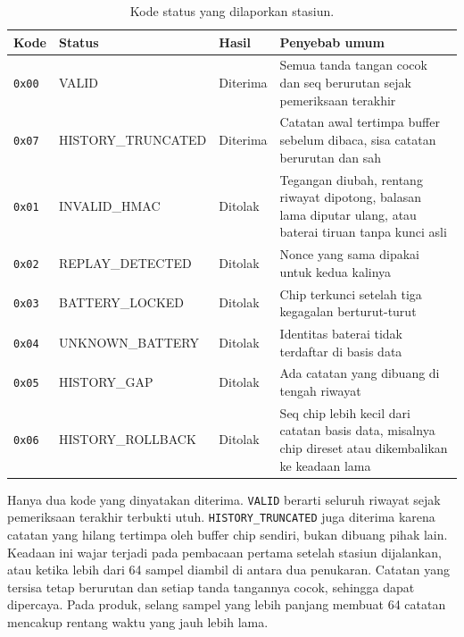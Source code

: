 \documentclass[11pt,a4paper]{article}
\begin{document}
\begin{table}[H]
  \centering
  \small
  \begin{tabularx}{\textwidth}{l l l X}
    \toprule
    Kode & Status & Hasil & Penyebab umum \\
    \midrule
    \texttt{0x00} & VALID & \textcolor{okgreen}{Diterima} & Semua tanda tangan cocok dan seq
      berurutan sejak pemeriksaan terakhir \\
    \texttt{0x07} & HISTORY\_TRUNCATED & \textcolor{okgreen}{Diterima} & Catatan awal tertimpa
      buffer sebelum dibaca, sisa catatan berurutan dan sah \\
    \midrule
    \texttt{0x01} & INVALID\_HMAC & \textcolor{accentred}{Ditolak} & Tegangan diubah, rentang
      riwayat dipotong, balasan lama diputar ulang, atau baterai tiruan tanpa kunci asli \\
    \texttt{0x02} & REPLAY\_DETECTED & \textcolor{accentred}{Ditolak} & Nonce yang sama dipakai
      untuk kedua kalinya \\
    \texttt{0x03} & BATTERY\_LOCKED & \textcolor{accentred}{Ditolak} & Chip terkunci setelah tiga
      kegagalan berturut-turut \\
    \texttt{0x04} & UNKNOWN\_BATTERY & \textcolor{accentred}{Ditolak} & Identitas baterai tidak
      terdaftar di basis data \\
    \texttt{0x05} & HISTORY\_GAP & \textcolor{accentred}{Ditolak} & Ada catatan yang dibuang di
      tengah riwayat \\
    \texttt{0x06} & HISTORY\_ROLLBACK & \textcolor{accentred}{Ditolak} & Seq chip lebih kecil dari
      catatan basis data, misalnya chip direset atau dikembalikan ke keadaan lama \\
    \bottomrule
  \end{tabularx}
  \caption{Kode status yang dilaporkan stasiun.}
  \label{tab:status}
\end{table}

Hanya dua kode yang dinyatakan diterima. \texttt{VALID} berarti seluruh riwayat sejak pemeriksaan
terakhir terbukti utuh. \texttt{HISTORY\_TRUNCATED} juga diterima karena catatan yang hilang
tertimpa oleh buffer chip sendiri, bukan dibuang pihak lain. Keadaan ini wajar terjadi pada
pembacaan pertama setelah stasiun dijalankan, atau ketika lebih dari 64 sampel diambil di antara
dua penukaran. Catatan yang tersisa tetap berurutan dan setiap tanda tangannya cocok, sehingga
dapat dipercaya. Pada produk, selang sampel yang lebih panjang membuat 64 catatan mencakup rentang
waktu yang jauh lebih lama.
\end{document}
